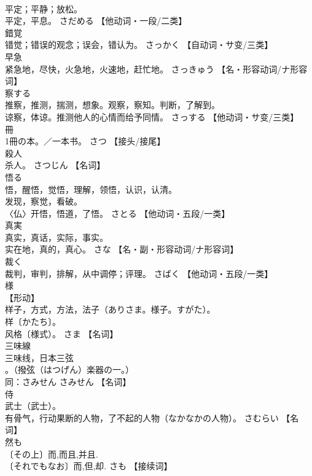 \documentclass[8pt]{extreport}
\begin{document}
\begin{CJK}{UTF8}{min}
\\	平定；平静；放松。 
\\	平定，平息。	さだめる		【他动词・一段/二类】
\\	錯覚	
\\	错觉；错误的观念；误会，错认为。	さっかく		【自动词・サ变/三类】
\\	早急	
\\	紧急地，尽快，火急地，火速地，赶忙地。	さっきゅう		【名・形容动词/ナ形容词】
\\	察する	
\\	推察，推测，揣测，想象。观察，察知。判断，了解到。 
\\	谅察，体谅。推测他人的心情而给予同情。	さっする		【他动词・サ变/三类】
\\	冊	
\\	1冊の本。／一本书。	さつ		【接头/接尾】
\\	殺人	
\\	杀人。	さつじん		【名词】
\\	悟る	
\\	悟，醒悟，觉悟，理解，领悟，认识，认清。 
\\	发现，察觉，看破。 
\\	〈仏〉开悟，悟道，了悟。	さとる		【他动词・五段/一类】
\\	真実	
\\	真实，真话，实际，事实。 
\\	实在地，真的，真心。	さな		【名・副・形容动词/ナ形容词】
\\	裁く	
\\	裁判，审判，排解，从中调停；评理。	さばく		【他动词・五段/一类】
\\	様	
\\	【形动】 
\\	样子，方式，方法，法子（ありさま。様子。すがた）。 
\\	样〔かたち〕。 
\\	风格〔様式）。	さま		【名词】
\\	三味線	
\\	三味线，日本三弦
\\	。（撥弦（はつげん）楽器の一。） 
\\	同：さみせん	さみせん		【名词】
\\	侍	
\\	武士（武士）。 
\\	有骨气，行动果断的人物，了不起的人物（なかなかの人物）。	さむらい		【名词】
\\	然も	
\\	〔その上〕而,而且,并且. 
\\	〔それでもなお〕而,但,却.	さも		【接续词】

\end{CJK}
\end{document}
